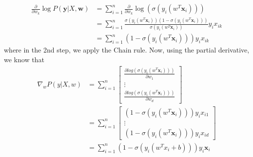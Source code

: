 \documentclass[11pt]{article}
\begin{document}
\begin{enumerate}
\begin{enumerate}[(a)]
   			 \begin{align*}
	   			 \frac{\partial}{\partial w_k}\log P(\mathbf{y} | X, \mathbf{w}) &= \sum_{i=1}^n \frac{\partial}{\partial w_k}  \log( \sigma(y_i(w^T\mathbf{x}_i))) \\
	   			 &= \sum_{i=1}^{n} \frac{\sigma(y_i(w^T\mathbf{x}_i)) (1 -\sigma(y_i(w^T\mathbf{x}_i)))}{\sigma(y_i(w^T\mathbf{x}_i))} y_i x_{ik}\\
	   			 &= \sum_{i=1}^n (1-\sigma(y_i(w^T\mathbf{x}_i))) y_i x_{ik}
   			 \end{align*}
    			where in the 2nd step, we apply the Chain rule. Now, using the partial derivative, we know that 
    			\begin{align*}
    				\nabla_w P(y|X,w) &=\sum_{i=1}^n
    				\begin{bmatrix}
    					\frac{\partial log( \sigma(y_i(w^T\mathbf{x}_i)))}{\partial w_1}  \\
    					\vdots \\
    					\frac{\partial log( \sigma(y_i(w^T\mathbf{x}_i)))}{\partial w_d}
    				\end{bmatrix} \\
    				& = \sum_{i=1}^n
    				\begin{bmatrix}
    		 			(1-\sigma(y_i(w^T\mathbf{x}_i))) y_i x_{i1}\\
    					\vdots \\
    	 				(1-\sigma(y_i(w^T\mathbf{x}_i))) y_i x_{id}
    				\end{bmatrix} \\
    				& = \sum_{i=1}^n (1-\sigma(y_i(w^Tx_i + b))) y_i \mathbf{x}_i
    			\end{align*}
		\end{enumerate}
	\end{enumerate}
	
\end{document}
